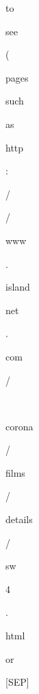\documentclass[varwidth=150mm]{standalone}
\begin{document}
\begin{CJK*}{UTF8}{gbsn}
{{{\colorbox{red!0.0}{\strut to} \colorbox{red!0.0}{\strut see} \colorbox{red!0.0}{\strut (} \colorbox{red!0.0}{\strut pages} \colorbox{red!0.0}{\strut such} \colorbox{red!0.0}{\strut as} \colorbox{red!0.0}{\strut http} \colorbox{red!0.0}{\strut :} \colorbox{red!0.0}{\strut /} \colorbox{red!0.0}{\strut /} \colorbox{red!0.0}{\strut www} \colorbox{red!0.0}{\strut .} \colorbox{red!0.0}{\strut island}\colorbox{red!0.0}{\strut net} \colorbox{red!0.0}{\strut .} \colorbox{red!0.0}{\strut com} \colorbox{red!0.0}{\strut /} \colorbox{red!0.0}{\strut ~} \colorbox{red!1.8929505348205566}{\strut corona} \colorbox{red!0.0}{\strut /} \colorbox{red!0.0}{\strut films} \colorbox{red!0.0}{\strut /} \colorbox{red!0.0}{\strut details} \colorbox{red!0.0}{\strut /} \colorbox{red!0.0}{\strut sw}\colorbox{red!0.0}{\strut 4} \colorbox{red!0.0}{\strut .} \colorbox{red!0.0}{\strut html} \colorbox{red!0.0}{\strut or} \colorbox{red!3.5331151485443115}{\strut [SEP]}
}}}
\end{CJK*}
\end{document}
